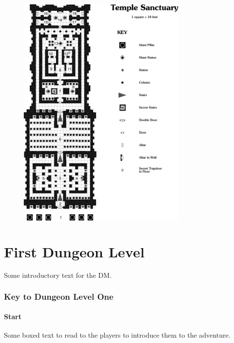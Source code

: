 \documentclass[a4paper,serif]{module}
\begin{document}
\begin{figure}[p]
\centering
\includegraphics[width=0.75\textwidth]{module_map.png}
\vspace{2em}
\label{img:map}
\end{figure}

\part{First Dungeon Level}

Some introductory text for the DM.

\section*{Key to Dungeon Level One}

\subsection*{Start}

\begin{boxtext}
Some boxed text to read to the players to introduce them to the adventure.
\end{boxtext}
\end{document}
